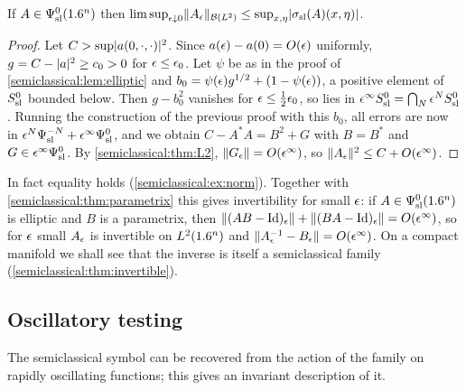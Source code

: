 \begin{corollary}\label{semiclassical:cor:norm}
  If $A\in\Psi^{0}_{\mathrm{sl}}(1.6^n)$ then
  $\limsup_{\epsilon\downarrow0}\lVert A_\epsilon\rVert_{\mathcal{B}(L^2)}\le\sup_{x,\eta}\lvert \sigma_{\mathrm{sl}}(A)(x,\eta)\rvert$.
\end{corollary}
\begin{proof}
  Let $C>\sup\lvert a(0,\cdot,\cdot)\rvert^2$. Since $a(\epsilon)-a(0)=O(\epsilon)$ uniformly,
  $g=C-\lvert a\rvert^2\ge c_0>0$ for $\epsilon\le\epsilon_0$. Let $\psi$ be as in the proof of
  \cref{semiclassical:lem:elliptic} and
  $b_0=\psi(\epsilon)g^{1/2}+(1-\psi(\epsilon))$, a positive element of $S^{0}_{\mathrm{sl}}$ bounded
  below. Then $g-b_0^2$ vanishes for $\epsilon\le\frac12\epsilon_0$, so lies in
  $\epsilon^\infty S^{0}_{\mathrm{sl}}=\bigcap_N\epsilon^NS^{0}_{\mathrm{sl}}$. Running the construction of the
  previous proof with this $b_0$, all errors are now in
  $\epsilon^{N}\Psi^{-N}_{\mathrm{sl}}+\epsilon^\infty\Psi^{0}_{\mathrm{sl}}$, and we obtain $C-A^*A=B^2+G$ with
  $B=B^*$ and $G\in\epsilon^\infty\Psi^{0}_{\mathrm{sl}}$. By \cref{semiclassical:thm:L2},
  $\lVert G_\epsilon\rVert=O(\epsilon^\infty)$, so $\lVert A_\epsilon\rVert^2\le C+O(\epsilon^\infty)$.
\end{proof}

In fact equality holds (\cref{semiclassical:ex:norm}). Together with
\cref{semiclassical:thm:parametrix} this gives invertibility for small $\epsilon$:
if $A\in\Psi^{0}_{\mathrm{sl}}(1.6^n)$ is elliptic and $B$ is a parametrix, then
$\lVert (AB-\operatorname{Id})_\epsilon\rVert+\lVert (BA-\operatorname{Id})_\epsilon\rVert=O(\epsilon^\infty)$, so for $\epsilon$ small
$A_\epsilon$ is invertible on $L^2(1.6^n)$ and $\lVert A_\epsilon^{-1}-B_\epsilon\rVert=O(\epsilon^\infty)$.
On a compact manifold we shall see that the inverse is itself a semiclassical
family (\cref{semiclassical:thm:invertible}).

\subsection{Oscillatory testing}
The semiclassical symbol can be recovered from the action of the family on
rapidly oscillating functions; this gives an invariant description of it.

